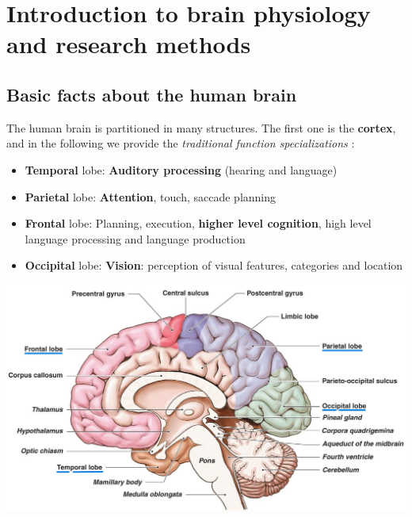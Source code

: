 \chapter{Introduction to brain physiology and research methods}
\label{chap:introduction}

\section{Basic facts about the human brain}
The human brain is partitioned in many structures. The first one is the \textbf{cortex}, and in the following we provide the \textit{traditional function specializations} \notet:
\begin{itemize}
    \item \textbf{Temporal} lobe: \textbf{Auditory processing} (hearing and language)
    \item \textbf{Parietal} lobe: \textbf{Attention}, touch, saccade planning
    \item \textbf{Frontal} lobe: Planning, execution, \textbf{higher level cognition}, high level language processing and language production
    \item \textbf{Occipital} lobe: \textbf{Vision}: perception of visual features, categories and location
\end{itemize}

\includegraphics[width=\textwidth]{images/brain.png}


